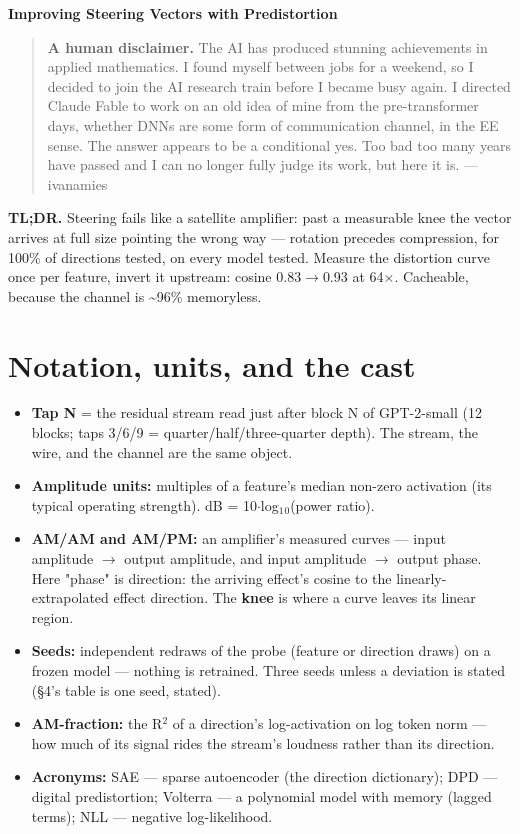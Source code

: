 \documentclass[10pt]{article}
\begin{document}
\begin{center}{\LARGE\bfseries Improving Steering Vectors with Predistortion}\end{center}

\begin{quote}\textbf{A human disclaimer.} The AI has produced stunning achievements in applied mathematics. I found myself between jobs for a weekend, so I decided to join the AI research train before I became busy again. I directed Claude Fable to work on an old idea of mine from the pre-transformer days, whether DNNs are some form of communication channel, in the EE sense. The answer appears to be a conditional yes. Too bad too many years have passed and I can no longer fully judge its work, but here it is. --- ivanamies\end{quote}

\textbf{TL;DR.} Steering fails like a satellite amplifier: past a measurable knee the vector arrives at
full size pointing the wrong way --- rotation precedes compression, for 100\% of directions tested, on
every model tested. Measure the distortion curve once per feature, invert it upstream: cosine
0.83$\to$0.93 at 64$\times$. Cacheable, because the channel is \textasciitilde{}96\% memoryless.

\section{Notation, units, and the cast}

\begin{itemize}\setlength\itemsep{1pt}
\item \textbf{Tap N} = the residual stream read just after block N of GPT-2-small (12 blocks; taps 3/6/9 = quarter/half/three-quarter depth). The stream, the wire, and the channel are the same object.
\item \textbf{Amplitude units:} multiples of a feature's median non-zero activation (its typical operating strength). dB = 10$\cdot$log$_{1}$$_{0}$(power ratio).
\item \textbf{AM/AM and AM/PM:} an amplifier's measured curves --- input amplitude $\to$ output amplitude, and input amplitude $\to$ output phase. Here "phase" is direction: the arriving effect's cosine to the linearly-extrapolated effect direction. The \textbf{knee} is where a curve leaves its linear region.
\item \textbf{Seeds:} independent redraws of the probe (feature or direction draws) on a frozen model --- nothing is retrained. Three seeds unless a deviation is stated (§4's table is one seed, stated).
\item \textbf{AM-fraction:} the R$^{2}$ of a direction's log-activation on log token norm --- how much of its signal rides the stream's loudness rather than its direction.
\item \textbf{Acronyms:} SAE --- sparse autoencoder (the direction dictionary); DPD --- digital predistortion; Volterra --- a polynomial model with memory (lagged terms); NLL --- negative log-likelihood.
\end{itemize}
\end{document}
